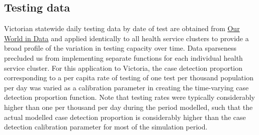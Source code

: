 \subsection{Testing data}
Victorian statewide daily testing data by date of test are obtained from \href{https://github.com/owid/covid-19-data/blob/master/public/data/owid-covid-data.csv}{Our World in Data} and applied identically to all health service clusters to provide a broad profile of the variation in testing capacity over time. Data sparseness precluded us from implementing separate functions for each individual health service cluster. For this application to Victoria, the case detection proportion corresponding to a per capita rate of testing of one test per thousand population per day was varied as a calibration parameter in creating the time-varying case detection proportion function. Note that testing rates were typically considerably higher than one per thousand per day during the period modelled, such that the actual modelled case detection proportion is considerably higher than the case detection calibration parameter for most of the simulation period.